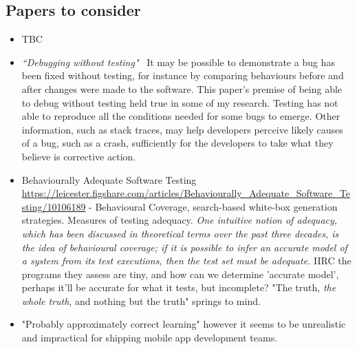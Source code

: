 \subsection{Papers to consider}
\begin{itemize}
    \item TBC
    \item \emph{``Debugging without testing"}~\cite{ghardallou2016debugging_without_testing} It may be possible to demonstrate a bug has been fixed without testing, for instance by comparing behaviours before and after changes were made to the software. This paper's premise of being able to debug without testing held true in some of my research. Testing has not able to reproduce all the conditions needed for some bugs to emerge. Other information, such as stack traces, may help developers perceive likely causes of a bug, such as a crash, sufficiently for the developers to take what they believe is corrective action.  
    \item Behaviourally Adequate Software Testing \url{https://leicester.figshare.com/articles/Behaviourally_Adequate_Software_Testing/10106189} - Behavioural Coverage, search-based white-box generation strategies. Measures of testing adequacy. \emph{One intuitive notion of adequacy, which has been discussed in theoretical terms over the past three decades, is the idea of behavioural coverage; if it is possible to infer an accurate model of a system from its test executions, then the test set must be adequate.} IIRC the programs they assess are tiny, and how can we determine 'accurate model', perhaps it'll be accurate for what it tests, but incomplete? "The truth, \emph{the whole truth}, and nothing but the truth" springs to mind. %
    \item "Probably approximately correct learning" however it seems to be unrealistic and impractical for shipping mobile app development teams.
\end{itemize}


